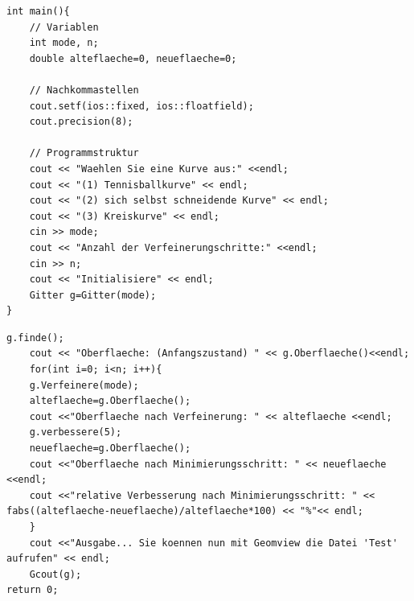 \documentclass{beamer}
\begin{document}
\begin{frame}[fragile]

\begin{lstlisting}
int main(){
	// Variablen
	int mode, n;
	double alteflaeche=0, neueflaeche=0;
	
	// Nachkommastellen
	cout.setf(ios::fixed, ios::floatfield);
	cout.precision(8);
	
	// Programmstruktur
	cout << "Waehlen Sie eine Kurve aus:" <<endl;
	cout << "(1) Tennisballkurve" << endl;
	cout << "(2) sich selbst schneidende Kurve" << endl;
	cout << "(3) Kreiskurve" << endl;
	cin >> mode;
	cout << "Anzahl der Verfeinerungschritte:" <<endl;
	cin >> n;
	cout << "Initialisiere" << endl;
	Gitter g=Gitter(mode);
}
\end{lstlisting}
\end{frame}
\begin{frame}[fragile]
\begin{lstlisting}
g.finde();
	cout << "Oberflaeche: (Anfangszustand) " << g.Oberflaeche()<<endl;
	for(int i=0; i<n; i++){
	g.Verfeinere(mode);
	alteflaeche=g.Oberflaeche();
	cout <<"Oberflaeche nach Verfeinerung: " << alteflaeche <<endl;
	g.verbessere(5);
	neueflaeche=g.Oberflaeche();
	cout <<"Oberflaeche nach Minimierungsschritt: " << neueflaeche <<endl;
	cout <<"relative Verbesserung nach Minimierungsschritt: " <<  fabs((alteflaeche-neueflaeche)/alteflaeche*100) << "%"<< endl;
	}
	cout <<"Ausgabe... Sie koennen nun mit Geomview die Datei 'Test' aufrufen" << endl;
	Gcout(g);
return 0;
\end{lstlisting}
\end{frame}
\end{document}

